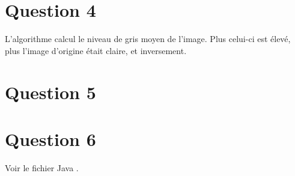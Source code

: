 \documentclass{report}
\begin{document}
		\section{Question 4}
			
			
			L'algorithme calcul le niveau de gris moyen de l'image. Plus celui-ci est élevé, plus l'image d'origine était claire, et inversement.
			
		\section{Question 5}
			
			
		\section{Question 6}
			Voir le fichier Java .
			
\end{document}
